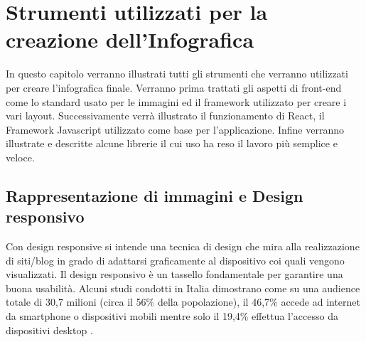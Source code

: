 \clearpage{\pagestyle{empty}\cleardoublepage}
\chapter{Strumenti utilizzati per la creazione dell'Infografica}               
\noindent In questo capitolo verranno illustrati tutti gli strumenti che verranno utilizzati per creare l'infografica finale. Verranno prima trattati gli aspetti di front-end come lo standard usato per le immagini ed il framework utilizzato per creare i vari layout. Successivamente verrà illustrato il funzionamento di React, il Framework Javascript utilizzato come base per l'applicazione. Infine verranno illustrate e descritte alcune librerie il cui uso ha reso il lavoro più semplice e veloce.
\section{Rappresentazione di immagini e Design responsivo}
\noindent Con design responsive si intende una tecnica di design che mira alla realizzazione di siti/blog in grado di adattarsi graficamente al dispositivo coi quali vengono visualizzati.
\noindent Il design responsivo è un tassello fondamentale per garantire una buona usabilità.\newline
Alcuni studi condotti in Italia dimostrano come su una audience totale di 30,7 milioni (circa il 56\% della popolazione), il 46,7\% accede ad internet da smartphone o dispositivi mobili mentre solo il 19,4\% effettua l'accesso da dispositivi desktop \cite{mobileFirst}.\newline
